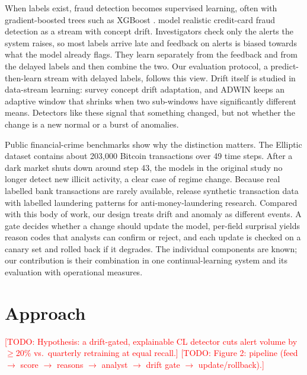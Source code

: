 \documentclass{article} %
\newcommand{\todo}[1]{\textcolor{red}{[TODO: #1]}}
\begin{document}
When labels exist, fraud detection becomes supervised learning, often with
gradient-boosted trees such as XGBoost \citep{chen2016xgboost}. 
\citet{dalpozzolo2018credit} model realistic credit-card fraud detection as a
stream with concept drift. Investigators check only the alerts the system raises, so
most labels arrive late and feedback on alerts is biased towards what the model
already flags. They learn separately from the feedback and from the delayed
labels and then combine the two. Our evaluation protocol, a predict-then-learn
stream with delayed labels, follows this view. Drift itself is studied in
data-stream learning: \citet{gama2014survey} survey concept drift adaptation,
and ADWIN \citep{bifet2007adwin} keeps an adaptive window that shrinks when
two sub-windows have significantly different means. Detectors like these
signal that something changed, but not whether the change is a new normal or a
burst of anomalies.

Public financial-crime benchmarks show why the distinction matters. The
Elliptic dataset \citep{weber2019elliptic} contains about 203{,}000 Bitcoin
transactions over 49 time steps. After a dark market shuts down around step 43,
the models in the original study no longer detect new illicit activity, a clear
case of regime change. Because real labelled bank transactions are rarely
available, \citet{altman2023realistic} release synthetic transaction data with
labelled laundering patterns for anti-money-laundering research. Compared with
this body of work, our design treats drift and anomaly as different events. A
gate decides whether a change should update the model, per-field surprisal
yields reason codes that analysts can confirm or reject, and each update is
checked on a canary set and rolled back if it degrades. The individual
components are known; our contribution is their combination in one
continual-learning system and its evaluation with operational measures.

\section{Approach}\label{sec:approach}
\todo{Hypothesis: a drift-gated, explainable CL detector cuts alert volume by
$\geq$20\% vs.\ quarterly retraining at equal recall.}
\todo{Figure 2: pipeline (feed $\rightarrow$ score
$\rightarrow$ reasons $\rightarrow$ analyst $\rightarrow$ drift gate $\rightarrow$ update/rollback).}
\end{document}
